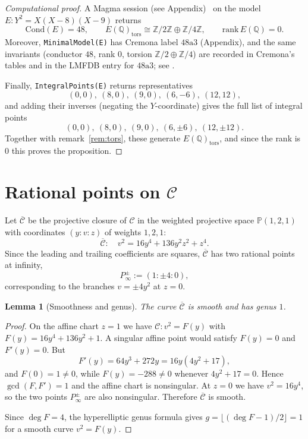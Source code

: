 \documentclass[12pt]{article}
\newtheorem{lemma}{Lemma}
\theoremstyle{remark}
\theoremstyle{definition}
\begin{document}
\begin{proof}[Computational proof]
A Magma session (see Appendix)~\cite{Magma} on the model
$E: Y^2 = X(X-8)(X-9)$ returns
\[
\mathrm{Cond}(E)=48,\qquad
E(\mathbb{Q})_{\mathrm{tors}}\cong \mathbb{Z}/2\mathbb{Z}\oplus\mathbb{Z}/4\mathbb{Z},\qquad
\mathrm{rank}\,E(\mathbb{Q})=0.
\]
Moreover, \texttt{MinimalModel(E)} has Cremona label $48\mathrm{a}3$ (Appendix), and the same invariants
(conductor $48$, rank $0$, torsion $\mathbb{Z}/2\oplus\mathbb{Z}/4$) are recorded in Cremona's tables and in the LMFDB entry for $48\mathrm{a}3$; see \cite{CremonaEC,LMFDB48a3}.

Finally, \texttt{IntegralPoints(E)} returns representatives
\[
(0,0),\ (8,0),\ (9,0),\ (6,-6),\ (12,12),
\]
and adding their inverses (negating the $Y$-coordinate) gives the full list of integral points
\[
(0,0),\ (8,0),\ (9,0),\ (6,\pm6),\ (12,\pm12).
\]
Together with remark~\ref{rem:tors}, these generate $E(\mathbb{Q})_{\mathrm{tors}}$, and since the rank is $0$ this proves the proposition.
\end{proof}


\section{Rational points on \texorpdfstring{$\mathcal{C}$}{C}}\label{sec:CQ}
Let $\overline{\mathcal{C}}$ be the projective closure of $\mathcal{C}$ in the weighted projective space $\mathbb{P}(1,2,1)$ with coordinates $(y:v:z)$ of weights $1,2,1$:
\[
\overline{\mathcal{C}}:\quad v^2=16y^4+136y^2z^2+z^4.
\]
Since the leading and trailing coefficients are squares, $\overline{\mathcal{C}}$ has two rational points at infinity,
\[
P_\infty^\pm:=(1:\pm4:0),
\]
corresponding to the branches $v=\pm4y^2$ at $z=0$.

\begin{lemma}[Smoothness and genus]\label{lem:genus1}
The curve $\overline{\mathcal{C}}$ is smooth and has genus $1$.
\end{lemma}

\begin{proof}
On the affine chart $z=1$ we have $\mathcal{C}: v^2=F(y)$ with $F(y)=16y^4+136y^2+1$.
A singular affine point would satisfy $F(y)=0$ and $F'(y)=0$.
But
\[
F'(y)=64y^3+272y=16y(4y^2+17),
\]
and $F(0)=1\neq0$, while $F(y)=-288\neq0$ whenever $4y^2+17=0$.
Hence $\gcd(F,F')=1$ and the affine chart is nonsingular. At $z=0$ we have $v^2=16y^4$, so the two points $P_\infty^\pm$ are also nonsingular.
Therefore $\overline{\mathcal{C}}$ is smooth.

Since $\deg F=4$, the hyperelliptic genus formula gives
$g=\lfloor(\deg F-1)/2\rfloor=1$ for a smooth curve $v^2=F(y)$.
\end{proof}
\end{document}
